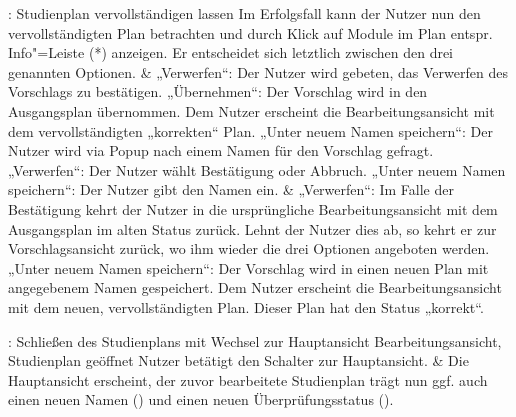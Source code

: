 \begin{usecase}{: Studienplan vervollständigen lassen}
	\hline
	Im Erfolgsfall kann der Nutzer nun den vervollständigten Plan betrachten und durch Klick auf Module im Plan entspr. Info"=Leiste (*) anzeigen.
	Er entscheidet sich letztlich zwischen den drei genannten Optionen. 
	& „Verwerfen“: Der Nutzer wird gebeten, das Verwerfen des Vorschlags zu bestätigen. \newline
	„Übernehmen“: Der Vorschlag wird in den Ausgangsplan übernommen. Dem Nutzer erscheint die Bearbeitungsansicht mit dem vervollständigten „korrekten“ Plan. \newline
	„Unter neuem Namen speichern“:  Der Nutzer wird via \gls{Popup} nach einem Namen für den Vorschlag gefragt. \\
	\hline
	„Verwerfen“: Der Nutzer wählt Bestätigung oder Abbruch. \newline
	„Unter neuem Namen speichern“: Der Nutzer gibt den Namen ein. 
	& „Verwerfen“: Im Falle der Bestätigung kehrt der Nutzer in die ursprüngliche Bearbeitungsansicht mit dem Ausgangsplan im alten Status zurück. Lehnt der Nutzer dies ab, so kehrt er zur Vorschlagsansicht zurück, wo ihm wieder die drei Optionen angeboten werden. \newline
	„Unter neuem Namen speichern“: Der Vorschlag wird in einen neuen Plan mit angegebenem Namen gespeichert. Dem Nutzer erscheint die Bearbeitungsansicht mit dem neuen, vervollständigten Plan. Dieser Plan hat den Status „korrekt“.
\end{usecase}

\begin{usecase}{: Schließen des Studienplans mit Wechsel zur Hauptansicht}
	{Bearbeitungsansicht, Studienplan geöffnet}
	Nutzer betätigt den Schalter zur Hauptansicht.
	& Die Hauptansicht erscheint, der zuvor bearbeitete Studienplan trägt nun ggf. auch einen neuen Namen () und einen neuen Überprüfungsstatus ().
\end{usecase}


\bigskip

\renewcommand{\arraystretch}{1.0}
\setlength{\LTpre}{\bigskipamount}
\setlength{\LTpost}{\bigskipamount}